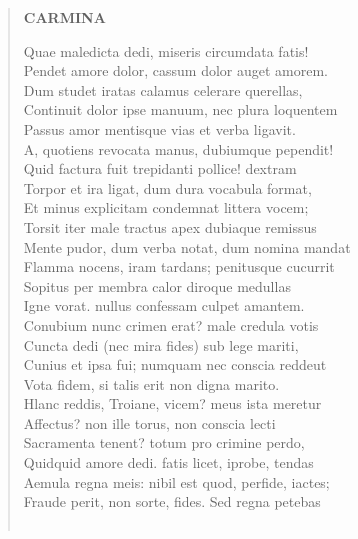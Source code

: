 \documentclass[11pt, a4paper]{report}
\begin{document}
\begin{verse}
    \begin{center} \textbf{CARMINA} \end{center}Quae maledicta dedi, miseris circumdata fatis! \\ Pendet amore dolor, cassum dolor auget amorem. \\ Dum studet iratas calamus celerare querellas, \\ Continuit dolor ipse manuum, nec plura loquentem \\ Passus amor mentisque vias et verba ligavit. \\ A, quotiens revocata manus, dubiumque pependit! \\ Quid factura fuit trepidanti pollice! dextram \\ Torpor et ira ligat, dum dura vocabula format, \\ Et minus explicitam condemnat littera vocem; \\ Torsit iter male tractus apex dubiaque remissus \\ Mente pudor, dum verba notat, dum nomina mandat \\ Flamma nocens, iram tardans; penitusque cucurrit \\ Sopitus per membra calor diroque medullas \\ Igne vorat. nullus confessam culpet amantem. \\ Conubium nunc crimen erat? male credula votis \\ Cuncta dedi (nec mira fides) sub lege mariti, \\ Cunius et ipsa fui; numquam nec conscia reddeut \\ Vota fidem, si talis erit non digna marito. \\ Hlanc reddis, Troiane, vicem? meus ista meretur \\ Affectus? non ille torus, non conscia lecti \\ Sacramenta tenent? totum pro crimine perdo, \\ Quidquid amore dedi. fatis licet, iprobe, tendas \\ Aemula regna meis: nibil est quod, perfide, iactes; \\ Fraude perit, non sorte, fides. Sed regna petebas \\ 
        ﻿\pagebreak 

\end{verse}
\end{document}
